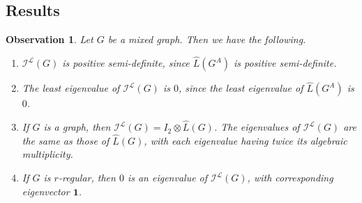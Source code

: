 \documentclass[12pt]{article}
\numberwithin{equation}{section}
\newtheorem{observation}{Observation}[section]
\begin{document}
	\subsection{Results}
	\begin{observation}\label{normalized observation}
		Let $G$ be a mixed graph. Then we have the following.
		\begin{enumerate}[(1)]
			\item $\mathcal{I}^\mathcal{L}(G)$ is positive semi-definite, since $\widehat{L}(G^A)$ is positive semi-definite.
			\item The least eigenvalue of $\mathcal{I}^\mathcal{L}(G)$ is $0$, since the least eigenvalue of $\widehat{L}(G^A)$ is $0$.
			\item If $G$ is a graph, then $\mathcal{I}^\mathcal{L}(G)=I_2\otimes\widehat{L}(G)$. The eigenvalues of $\mathcal{I}^\mathcal{L}(G)$ are the same as those of $\widehat{L}(G)$, with each eigenvalue having twice its algebraic multiplicity.
			\item If $G$ is $r$-regular, then $0$ is an eigenvalue of $\mathcal{I}^\mathcal{L}(G)$, with corresponding eigenvector $\boldsymbol{1}$.
		\end{enumerate}
	\end{observation}
\end{document}
